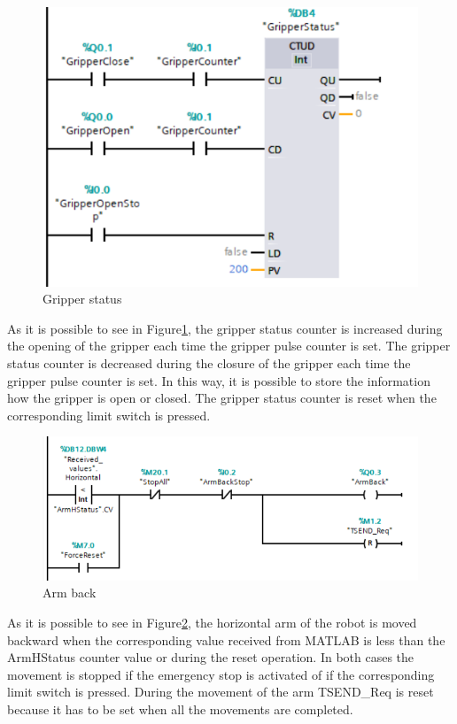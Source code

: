 \begin{figure}[!h]
\begin{center}
\includegraphics[width=0.6\linewidth]{capitolo3/figure/Segmento1_16.PNG}
\caption{Gripper status}
\label{fig:gripper_status}
\end{center}
\end{figure}

As it is possible to see in Figure\ref{fig:gripper_status}, the gripper status counter is increased during the opening of the gripper each time the gripper pulse counter is set. The gripper status counter is decreased during the closure of the gripper each time the gripper pulse counter is set. In this way, it is possible to store the information how the gripper is open or closed. The gripper status counter is reset when the corresponding limit switch is pressed.

\begin{figure}[!h]
\begin{center}
\includegraphics[width=0.6\linewidth]{capitolo3/figure/Segmento1_4_AB.PNG}
\caption{Arm back}
\label{fig:arm_back}
\end{center}
\end{figure}

As it is possible  to see in Figure\ref{fig:arm_back}, the horizontal arm of the robot is moved backward when the corresponding value received from MATLAB is less than the ArmHStatus counter value or during the reset operation. In both cases the movement is stopped if the emergency stop is activated of if the corresponding limit switch is pressed. During the movement of the arm TSEND\_Req is reset because it has to be set when all the movements are completed.


